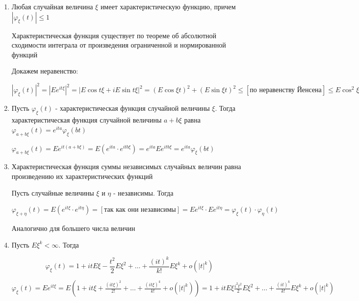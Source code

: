 \documentclass[12pt]{article}
\begin{document}
\begin{enumerate}
    \item Любая случайная величина $\xi$ имеет характеристическую функцию, причем $|\varphi_\xi(t)| \leq 1$

    \begin{MyProof}
        Характеристическая функция существует по теореме об абсолютной сходимости интеграла от произведения ограниченной и 
        нормированной функций

        Докажем неравенство:

        $|\varphi_\xi(t)|^2 = |Ee^{it\xi}|^2 = |E\cos t\xi + iE\sin t\xi|^2 = (E\cos\xi t)^2 + (E \sin\xi t)^2 \leq [\text{по неравенству Йенсена}] \leq
        E\cos^2 \xi t + E\sin^2 \xi t = E(\cos^2 \xi t + \sin^2 \xi t) = E 1 = 1$
    \end{MyProof}

    \item Пусть $\varphi_\xi(t)$ - характеристическая функция случайной величины $\xi$. Тогда характеристическая функция
    случайной величины $a + b\xi$ равна $\varphi_{a + b\xi}(t) = e^{ita} \varphi_{\xi}(bt)$

    \begin{MyProof}
        $\varphi_{a + b\xi}(t) = Ee^{it(a + b\xi)} = E(e^{ita} \cdot e^{itb\xi}) = e^{ita}Ee^{itb\xi} = e^{ita} \varphi_{\xi}(bt)$
    \end{MyProof}

    \item Характеристическая функция суммы независимых случайных величин равна произведению их характеристических функций

    \begin{MyProof}
        Пусть случайные величины $\xi$ и $\eta$ - независимы. Тогда 

        $\varphi_{\xi + \eta}(t) = E(e^{it\xi} \cdot e^{it\eta}) = [\text{так как они независимы}] = Ee^{it\xi} \cdot Ee^{it\eta} = \varphi_\xi(t) \cdot \varphi_\eta(t)$

        Аналогично для большего числа величин
    \end{MyProof}

    \item Пусть $E\xi^k < \infty$. Тогда 

    \[\varphi_\xi(t) = 1 + it E\xi - \frac{t^2}{2}E\xi^2 + \dots + \frac{(it)^k}{k!} E\xi^k + o(|t|^k)\]

    \begin{MyProof}
        $\varphi_\xi(t) = Ee^{it\xi} = E(1 + it\xi + \frac{(it\xi)^2}{2!} + \dots + \frac{(it\xi)^k}{k!} + o(|t|^k)) = 
        1 + it E\xi \frac{i^2 t^2}{2}E\xi^2 + \dots + \frac{(it)^k}{k!} E\xi^k + o(|t|^k)$
    \end{MyProof}


\end{enumerate}
\end{document}
